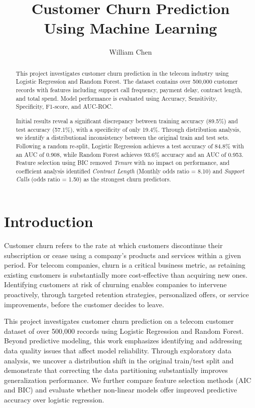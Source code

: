 \documentclass[12pt]{article}
\title{
    \vspace{-1cm}
    \Large\textbf{Customer Churn Prediction\\Using Machine Learning}
}
\author{
    William Chen
}
\date{}
\begin{document}
\maketitle
\thispagestyle{empty}

\begin{abstract}
This project investigates customer churn prediction in the telecom industry using 
Logistic Regression and Random Forest. The dataset contains over 500,000 customer 
records with features including support call frequency, payment delay, contract 
length, and total spend. Model performance is evaluated using Accuracy, Sensitivity, 
Specificity, F1-score, and AUC-ROC.

Initial results reveal a significant discrepancy between training accuracy (89.5\%) 
and test accuracy (57.1\%), with a specificity of only 19.4\%. Through distribution analysis, we identify a distributional inconsistency 
between the original train and test sets. Following a random re-split, Logistic 
Regression achieves a test accuracy of 84.8\% with an AUC of 0.908, while Random 
Forest achieves 93.6\% accuracy and an AUC of 0.953. Feature selection using BIC 
removed \textit{Tenure} with no impact on performance, and coefficient analysis 
identified \textit{Contract Length} (Monthly odds ratio = 8.10) and 
\textit{Support Calls} (odds ratio = 1.50) as the strongest churn predictors.
\end{abstract}

\newpage

\section{Introduction}
Customer churn refers to the rate at which customers discontinue their subscription 
or cease using a company's products and services within a given period. For telecom 
companies, churn is a critical business metric, as retaining existing customers is 
substantially more cost-effective than acquiring new ones. Identifying customers at 
risk of churning enables companies to intervene proactively, through targeted 
retention strategies, personalized offers, or service improvements, before the 
customer decides to leave.

This project investigates customer churn prediction on a telecom customer dataset 
of over 500,000 records using Logistic Regression and Random Forest. Beyond 
predictive modeling, this work emphasizes identifying and addressing data quality 
issues that affect model reliability. Through exploratory data analysis, we uncover 
a distribution shift in the original train/test split and demonstrate that 
correcting the data partitioning substantially improves generalization performance. 
We further compare feature selection methods (AIC and BIC) and evaluate whether 
non-linear models offer improved predictive accuracy over logistic regression.
\end{document}
